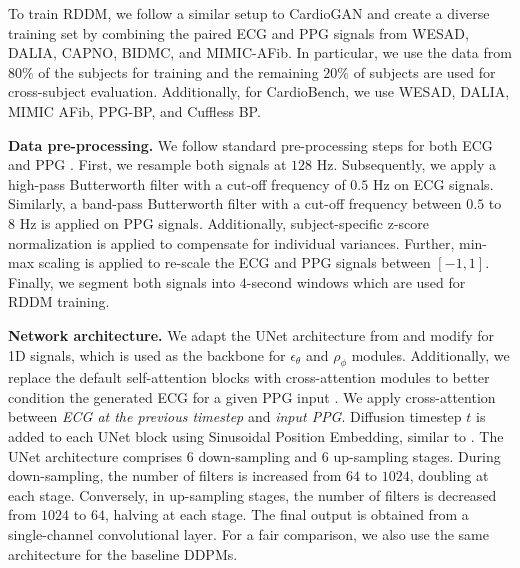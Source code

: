 \documentclass[letterpaper]{article} %
\begin{document}
\noindent To train RDDM, we follow a similar setup to CardioGAN \cite{sarkar2021cardiogan} and create a diverse training set by combining the paired ECG and PPG signals from WESAD, DALIA, CAPNO, BIDMC, and MIMIC-AFib. In particular, we use the data from $80\%$ of the subjects for training and the remaining $20\%$ of subjects are used for cross-subject evaluation. Additionally, for CardioBench, we use WESAD, DALIA, MIMIC AFib, PPG-BP, and Cuffless BP.







\noindent \textbf{Data pre-processing.} 
We follow standard pre-processing steps for both ECG \cite{pan1985real, Makowski2021neurokit} and PPG \cite{Makowski2021neurokit}. First, we resample both signals at $128$ Hz. Subsequently, we apply a high-pass Butterworth filter with a cut-off frequency of $0.5$ Hz on ECG signals. Similarly, a band-pass Butterworth filter with a cut-off frequency between $0.5$ to $8$ Hz is applied on PPG signals. Additionally, subject-specific z-score normalization is applied to compensate for individual variances. Further, min-max scaling is applied to re-scale the ECG and PPG signals between $[-1, 1]$. Finally, we segment both signals into $4$-second windows which are used for RDDM training.

\noindent\textbf{Network architecture.} We adapt the UNet architecture from \cite{ho2020denoising, dhariwal2021diffusion} and modify for 1D signals, which is used as the backbone for $\epsilon_{\theta}$ and $\rho_{\phi}$ modules. Additionally, we replace the default self-attention blocks with cross-attention modules to better condition the generated ECG for a given PPG input \cite{saharia2022photorealistic}. We apply cross-attention between \textit{ECG at the previous timestep} and \textit{input PPG}. Diffusion timestep $t$ is added to each UNet block using Sinusoidal Position Embedding, similar to \cite{ho2020denoising, dhariwal2021diffusion, saharia2022photorealistic}.
The UNet architecture comprises $6$ down-sampling and $6$ up-sampling stages. During down-sampling, the number of filters is increased from $64$ to $1024$, doubling at each stage. Conversely, in up-sampling stages, the number of filters is decreased from $1024$ to $64$, halving at each stage. The final output is obtained from a single-channel convolutional layer. For a fair comparison, we also use the same architecture for the baseline DDPMs. 
\end{document}
